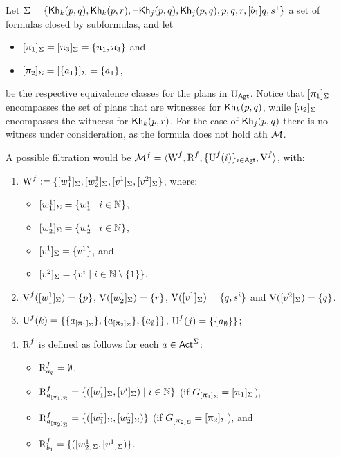 \begin{example}
Let $\Sigma = \{ {\sf Kh}_k(p,q),{\sf Kh}_k(p,r),\neg{\sf Kh}_j(p,q),{\sf Kh}_j(p,q),p,q,r,[b_1] q,s^1 \}$ a set of formulas closed by subformulas, and let 
\begin{itemize}
    \item $[\uppi_1]_\Sigma = [\uppi_3]_\Sigma = \{ \uppi_1,\uppi_3 \}$ and 
    \item $[\uppi_2]_\Sigma = [\{ a_1 \}]_\Sigma= \{ a_1 \}$,
\end{itemize}
be the respective equivalence classes for the plans in $\operatorname{U}_{\rm \sf Agt}$. Notice that $[\uppi_1]_\Sigma$ encompasses the set of plans that are witnesses for ${\sf Kh}_k(p,q)$, while $[\uppi_2]_\Sigma$ encompasses the witneess for ${\sf Kh}_k(p,r)$. For the case of ${\sf Kh}_j(p,q)$ there is no witness under consideration, as the formula does not hold ath $\mathcal{M}$.   

A possible filtration would be $\mathcal{M}^f = \langle \operatorname{W}^f,\operatorname{R}^f, \{ \operatorname{U}^f(i) \}_{i\in {\rm \sf Agt}}, \operatorname{V}^f \rangle$, with: 
\begin{enumerate}
\item $\operatorname{W}^f := \{ [w^1_1]_\Sigma,[w^1_2]_\Sigma,[v^1]_\Sigma,[v^2]_\Sigma \}$, where:
    \begin{itemize}
        \item $[w^1_1]_\Sigma=\{ w^i_1 \mid i\in\mathbb{N} \}$,
        \item $[w^1_2]_\Sigma=\{ w^i_2 \mid i\in\mathbb{N} \}$, 
        \item $[v^1]_\Sigma=\{ v^1 \}$, 
        and 
        \item $[v^2]_\Sigma=\{ v^i \mid i\in\mathbb{N}\setminus\{ 1 \} \}$.
    \end{itemize}
\item $\operatorname{V}^f([w^1_1]_\Sigma) = \{ p \}$, $\operatorname{V}([w^1_2]_\Sigma) = \{ r \}$, $\operatorname{V}([v^1]_\Sigma) = \{ q,s^i \}$ and $\operatorname{V}([v^2]_\Sigma) = \{ q \}$.
\item
$\operatorname{U}^f(k) = \{ \{ a_{[\uppi_1]_\Sigma} \}, \{ a_{[\uppi_2]_\Sigma} \}, \{ a_\emptyset \} \}$,
$\operatorname{U}^f(j) = \{ \{ a_\emptyset \} \}$;
\item $\operatorname{R}^f$ is defined as follows for each $a\in{\rm \sf Act}^\Sigma$:
\begin{itemize}
\item $\operatorname{R}^f_{a_\emptyset} = \emptyset$,
\item $\operatorname{R}^f_{a_{[\uppi_1]_\Sigma}} = \{ ([w^1_1]_\Sigma,[v^i]_\Sigma) \mid i \in \mathbb{N} \}$ (if $G_{[\uppi_1]_\Sigma} = [\uppi_1]_\Sigma$),
\item $\operatorname{R}^f_{a_{[\uppi_2]_\Sigma}} = \{ ([w^1_1]_\Sigma,[w^1_2]_\Sigma) \}$ (if $G_{[\uppi_2]_\Sigma} = [\uppi_2]_\Sigma$), and 
\item $\operatorname{R}^f_{b_1} = \{ ([w^1_2]_\Sigma,[v^1]_\Sigma) \}$. %
\end{itemize}
\end{enumerate}


\end{example}
